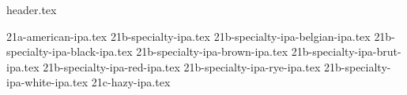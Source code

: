 \clearpage
{}
\divisorLine

{header.tex}

\begin{multicols}{2}

{21a-american-ipa.tex}
{21b-specialty-ipa.tex}
{21b-specialty-ipa-belgian-ipa.tex}
{21b-specialty-ipa-black-ipa.tex}
{21b-specialty-ipa-brown-ipa.tex}
{21b-specialty-ipa-brut-ipa.tex}
{21b-specialty-ipa-red-ipa.tex}
{21b-specialty-ipa-rye-ipa.tex}
{21b-specialty-ipa-white-ipa.tex}
{21c-hazy-ipa.tex}

\end{multicols}